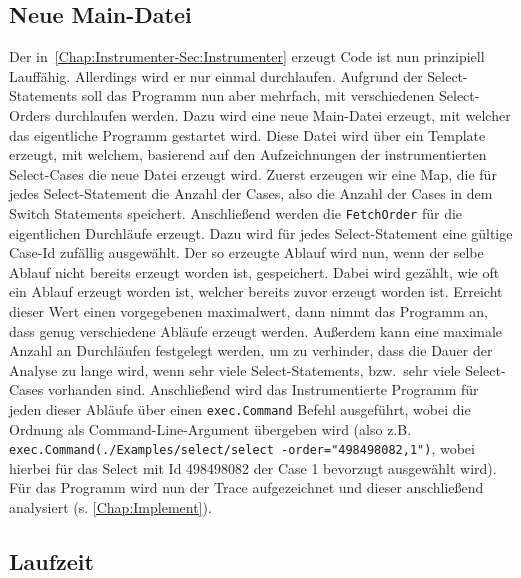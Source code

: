 \subsection{Neue Main-Datei}
Der in~\ref{Chap:Instrumenter-Sec:Instrumenter} erzeugt Code ist nun 
prinzipiell Lauffähig. Allerdings wird er nur einmal durchlaufen. Aufgrund der 
Select-Statements soll das Programm nun aber mehrfach, mit verschiedenen 
Select-Orders durchlaufen werden. Dazu wird eine neue Main-Datei erzeugt, mit 
welcher das eigentliche Programm gestartet wird. Diese Datei wird über ein 
Template erzeugt, mit welchem, basierend auf den Aufzeichnungen der instrumentierten 
Select-Cases die neue Datei erzeugt wird. Zuerst erzeugen wir eine Map, die 
für jedes Select-Statement die Anzahl der Cases, also die Anzahl der Cases in 
dem Switch Statements speichert. Anschließend werden die \texttt{FetchOrder}
für die eigentlichen Durchläufe erzeugt. Dazu wird für jedes Select-Statement 
eine gültige Case-Id zufällig ausgewählt. Der so erzeugte Ablauf wird nun, 
wenn der selbe Ablauf nicht bereits erzeugt worden ist, gespeichert. 
Dabei wird gezählt, wie oft ein Ablauf erzeugt worden ist, welcher bereits 
zuvor erzeugt worden ist. Erreicht dieser Wert einen vorgegebenen maximalwert,
dann nimmt das Programm an, dass genug verschiedene Abläufe erzeugt werden. 
Außerdem kann eine maximale Anzahl an Durchläufen festgelegt werden, um zu 
verhinder, dass die Dauer der Analyse zu lange wird, wenn sehr viele Select-Statements,
bzw.\ sehr viele Select-Cases vorhanden sind. Anschließend wird das Instrumentierte 
Programm für jeden dieser Abläufe über einen \texttt{exec.Command} Befehl 
ausgeführt, wobei die Ordnung als Command-Line-Argument übergeben wird 
(also z.B. \texttt{exec.Command(./Examples/select/select -order="498498082,1")}, 
wobei hierbei für das Select mit Id 498498082 der Case 1 bevorzugt ausgewählt
wird). Für das Programm wird nun der Trace aufgezeichnet und dieser 
anschließend analysiert (s. \ref{Chap:Implement}).





\subsection{Laufzeit}\label{Chap:Tracer-Sec:Laufzeit}
